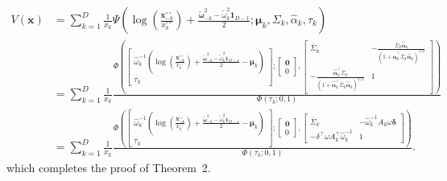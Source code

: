 \documentclass[12pt]{article}
\begin{document}
\begin{align*}
V(\bm x) &= \sum_{k=1}^D \frac{1}{x_k}
\Psi \left( \log \left( \frac{\bm x^{\circ\circ}_{-k}}{x^{\circ\circ}_k} \right) + \frac{\tilde{\bm \omega}_{-k}^2 - \tilde{\omega}_k^2\bm 1_{D-1}}{2} ; \bm \mu_k, \Sigma_k, \hat{\alpha}_k, \tau_k \right) \\
%
&= \sum_{k=1}^D \frac{1}{x_k} 
\frac{\Phi \left(
    \begin{bmatrix} 
        \hat{\omega}_k^{-1}\left( \log \left( \frac{\bm x^{\circ\circ}_{-k}}{x^{\circ\circ}_k} \right) + \frac{\tilde{\bm \omega}_{-k}^2 - \tilde{\omega}_k^2\bm 1_{D-1}}{2} - \bm \mu_k\right)  \\
        \tau_k
    \end{bmatrix};
    \begin{bmatrix} 
    \bm 0 \\ 0
    \end{bmatrix},
    \begin{bmatrix}
        \bar\Sigma_k & -\frac{\bar{\Sigma}_k \hat{\bm\alpha}_k}{(1+\hat{\bm\alpha}_k^\top\bar{\Sigma}_k \hat{\bm\alpha}_k)^{1/2}} \\
       -\frac{\hat{\bm\alpha}_k^\top\bar{\Sigma}_k}{\left(1+\hat{\bm\alpha}_k^\top\bar{\Sigma}_k \hat{\bm\alpha}_k\right)^{1/2}} &	1
    \end{bmatrix} \right)
    }
    {\Phi\left(\tau_k; 0, 1\right)} \\
&= \sum_{k=1}^D \frac{1}{x_k} 
\frac{\Phi \left(
    \begin{bmatrix} 
        \hat{\omega}_k^{-1}\left( \log \left( \frac{\bm x^{\circ\circ}_{-k}}{x^{\circ\circ}_k} \right) + \frac{\tilde{\bm \omega}_{-k}^2 - \tilde{\omega}_k^2\bm 1_{D-1}}{2} - \bm \mu_k\right)  \\
        \tau_k
    \end{bmatrix};
    \begin{bmatrix} 
    \bm 0 \\ 0
    \end{bmatrix},
    \begin{bmatrix}
        \bar\Sigma_k & - \hat{\omega}_k^{-1} A_k \omega \bm \delta \\
       - \delta^\top \omega A_k^\top \hat{\omega}_k^{-1} &	1
    \end{bmatrix} \right)
    }
    {\Phi\left(\tau_k; 0, 1\right)}.
\end{align*}
%
which completes the proof of Theorem~2.
\end{document}
